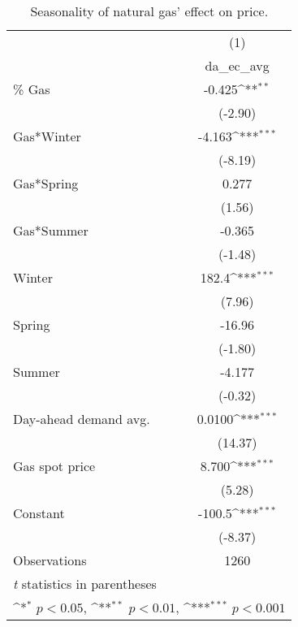 \begin{table}[htbp]\centering
\def\sym#1{\ifmmode^{#1}\else\(^{#1}\)\fi}
\caption{Seasonality of natural gas' effect on price.\label{tab1}}
\begin{tabular}{l*{1}{c}}
\hline\hline
                    &\multicolumn{1}{c}{(1)}\\
                    &\multicolumn{1}{c}{da\_ec\_avg}\\
\hline
\% Gas               &      -0.425\sym{**} \\
                    &     (-2.90)         \\
[1em]
Gas*Winter          &      -4.163\sym{***}\\
                    &     (-8.19)         \\
[1em]
Gas*Spring          &       0.277         \\
                    &      (1.56)         \\
[1em]
Gas*Summer          &      -0.365         \\
                    &     (-1.48)         \\
[1em]
Winter              &       182.4\sym{***}\\
                    &      (7.96)         \\
[1em]
Spring              &      -16.96         \\
                    &     (-1.80)         \\
[1em]
Summer              &      -4.177         \\
                    &     (-0.32)         \\
[1em]
Day-ahead demand avg.         &      0.0100\sym{***}\\
                    &     (14.37)         \\
[1em]
Gas spot price      &       8.700\sym{***}\\
                    &      (5.28)         \\
[1em]
Constant            &      -100.5\sym{***}\\
                    &     (-8.37)         \\
\hline
Observations        &        1260         \\
\hline\hline
\multicolumn{2}{l}{\footnotesize \textit{t} statistics in parentheses}\\
\multicolumn{2}{l}{\footnotesize \sym{*} \(p<0.05\), \sym{**} \(p<0.01\), \sym{***} \(p<0.001\)}\\
\end{tabular}
\end{table}

